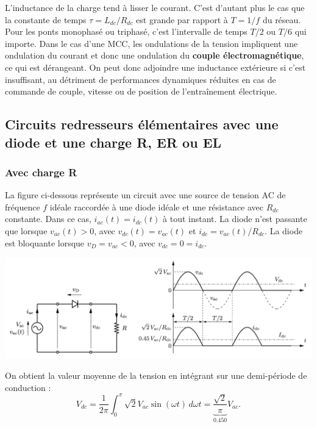 			L'inductance de la charge tend à lisser le courant. C'est d'autant plus le cas que la constante de temps $\tau = L_{dc}/R_{dc}$ est grande par rapport à $T=1/f$ du réseau. Pour les ponts monophasé ou triphasé, c'est l'intervalle de temps $T/2$ ou $T/6$ qui importe. Dans le cas d'une MCC, les ondulations de la tension impliquent une ondulation du courant et donc une ondulation du \textbf{couple électromagnétique}, ce qui est dérangeant. On peut donc adjoindre une inductance extérieure si c'est insuffisant, au détriment de performances dynamiques réduites en cas de commande de couple, vitesse ou de position de l'entraînement électrique. 
			
		\subsection{Circuits redresseurs élémentaires avec une diode et une charge R, ER ou EL}
			\subsubsection{Avec charge R}
				La figure ci-dessous représente un circuit avec une source de tension AC de fréquence $f$ idéale raccordée à une diode idéale et une résistance avec $R_{dc}$ constante. Dans ce cas, $i_{ac}(t)=i_{dc}(t)$ à tout instant. La diode n'est passante que lorsque $v_{ac}(t)>0$, avec $v_{dc}(t)=v_{ac}(t)$ et $i_{dc}=v_{ac}(t)/R_{dc}$. La diode est bloquante lorsque $v_D=v_{ac}<0$, avec $v_{dc}=0=i_{dc}$.
				
				\begin{center}
					\includegraphics[scale=0.45]{ch2/3}
				\end{center}
				
				On obtient la valeur moyenne de la tension en intégrant sur une demi-période de conduction :
				\begin{equation}
					V_{dc} = \frac{1}{2\pi} \int _0^\pi \sqrt{2}V_{ac}\sin (\omega t) \, d\omega t = \underbrace{\frac{\sqrt{2}}{\pi}}_{0.450} V_{ac}.
					\label{eq:2.5}
				\end{equation}
				
